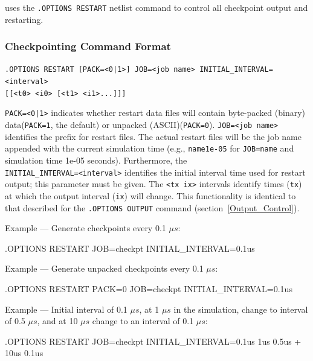 \Xyce{} uses the   \verb|.OPTIONS RESTART|
netlist command to control all checkpoint output and restarting.  

\subsubsection{Checkpointing Command Format}
  

\begin{XyceItemize}
\item \verb+.OPTIONS RESTART [PACK=<0|1>] JOB=<job name> INITIAL_INTERVAL=<interval>+ \\
  \verb+[[<t0> <i0> [<t1> <i1>...]]]+

  \texttt{PACK=<0|1>} indicates whether restart data files will contain byte-packed (binary) data(\texttt{PACK=1}, the default) or unpacked (ASCII)(\texttt{PACK=0}).
  \texttt{JOB=<job name>} identifies the prefix for restart files.  The actual restart files will be the job name appended with the current simulation time (e.g., \texttt{name1e-05} for \texttt{JOB=name} and simulation time 1e-05 seconds).  Furthermore, the\\ \texttt{INITIAL\_INTERVAL=<interval>} identifies the initial interval time used for restart output; this parameter must be given.  The \texttt{<tx ix>} intervals identify times (\texttt{tx}) at which the output interval (\texttt{ix}) will change.  This functionality is identical to that described for the 
  \texttt{.OPTIONS OUTPUT} command (section~\ref{Output_Control}).
\item Example --- Generate checkpoints every 0.1 $\mu s$:
\begin{vquote}
.OPTIONS RESTART JOB=checkpt INITIAL_INTERVAL=0.1us
\end{vquote}
\item Example --- Generate unpacked checkpoints every 0.1 $\mu s$:
\begin{vquote}
.OPTIONS RESTART PACK=0 JOB=checkpt INITIAL_INTERVAL=0.1us
\end{vquote}
\item Example --- Initial interval of 0.1 $\mu s$, at 1 $\mu s$ in the
  simulation, change to interval of 0.5 $\mu s$, and at 10 $\mu s$ change to an
  interval of 0.1 $\mu s$:
\begin{vquote}
.OPTIONS RESTART JOB=checkpt INITIAL_INTERVAL=0.1us 1us 0.5us
+ 10us 0.1us
\end{vquote}
\end{XyceItemize}


